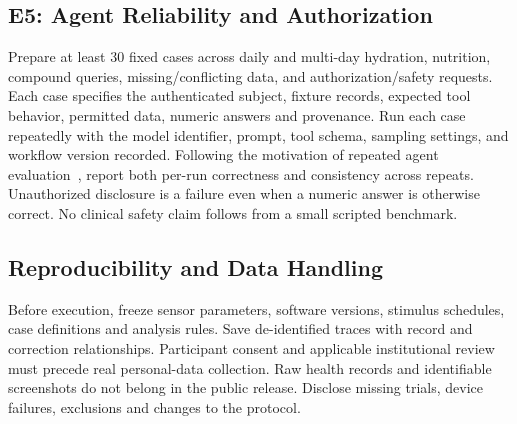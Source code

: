 \subsection{E5: Agent Reliability and Authorization}
Prepare at least 30 fixed cases across daily and multi-day hydration, nutrition, compound queries, missing/conflicting data, and authorization/safety requests. Each case specifies the authenticated subject, fixture records, expected tool behavior, permitted data, numeric answers and provenance. Run each case repeatedly with the model identifier, prompt, tool schema, sampling settings, and workflow version recorded. Following the motivation of repeated agent evaluation~\cite{yao2024tau}, report both per-run correctness and consistency across repeats. Unauthorized disclosure is a failure even when a numeric answer is otherwise correct. No clinical safety claim follows from a small scripted benchmark.

\subsection{Reproducibility and Data Handling}
Before execution, freeze sensor parameters, software versions, stimulus schedules, case definitions and analysis rules. Save de-identified traces with record and correction relationships. Participant consent and applicable institutional review must precede real personal-data collection. Raw health records and identifiable screenshots do not belong in the public release. Disclose missing trials, device failures, exclusions and changes to the protocol.
